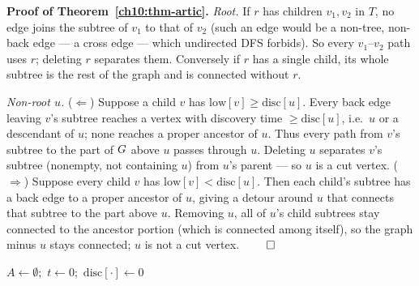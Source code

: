 \begin{formalbox}
\textbf{Proof of Theorem~\ref{ch10:thm-artic}.}
\emph{Root.} If $r$ has children $v_1,v_2$ in $T$, no edge joins the subtree of $v_1$ to
that of $v_2$ (such an edge would be a non-tree, non-back edge --- a cross edge ---
which undirected DFS forbids). So every $v_1$--$v_2$ path uses $r$; deleting $r$
separates them. Conversely if $r$ has a single child, its whole subtree is the rest of
the graph and is connected without $r$.

\emph{Non-root $u$.} ($\Leftarrow$) Suppose a child $v$ has
$\mathrm{low}[v]\ge\mathrm{disc}[u]$. Every back edge leaving $v$'s subtree reaches a
vertex with discovery time $\ge\mathrm{disc}[u]$, i.e.\ $u$ or a descendant of $u$;
none reaches a proper ancestor of $u$. Thus every path from $v$'s subtree to the part
of $G$ above $u$ passes through $u$. Deleting $u$ separates $v$'s subtree (nonempty,
not containing $u$) from $u$'s parent --- so $u$ is a cut vertex.
($\Rightarrow$) Suppose every child $v$ has $\mathrm{low}[v]<\mathrm{disc}[u]$. Then each
child's subtree has a back edge to a proper ancestor of $u$, giving a detour around $u$
that connects that subtree to the part above $u$. Removing $u$, all of $u$'s child
subtrees stay connected to the ancestor portion (which is connected among itself), so
the graph minus $u$ stays connected; $u$ is not a cut vertex. $\qed$
\end{formalbox}

\begin{algorithm}[H]
\caption{\textsc{Articulation}: list all cut vertices in one DFS}
\label{ch10:alg-artic}
$A\gets\emptyset$;\ $t\gets0$;\ $\mathrm{disc}[\cdot]\gets0$\;
\end{algorithm}

